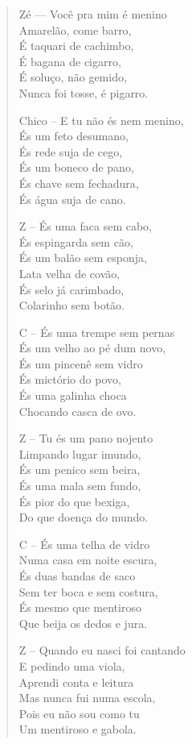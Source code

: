 \begin{verse}
Zé — Você pra mim é menino\\
Amarelão, come barro,\\
É taquari de cachimbo,\\
É bagana de cigarro,\\
É soluço, não gemido,\\
Nunca foi tosse, é pigarro.

Chico – E tu não és nem menino,\\
És um feto desumano,\\
És rede suja de cego,\\
És um boneco de pano,\\
És chave sem fechadura,\\
És água suja de cano.

Z – És uma faca sem cabo,\\
És espingarda sem cão,\\
És um balão sem esponja,\\
Lata velha de covão,\\
És selo já carimbado,\\
Colarinho sem botão.

C – És uma trempe sem pernas\\
És um velho ao pé dum novo,\\
És um pincenê sem vidro\\
És mictório do povo,\\
És uma galinha choca\\
Chocando casca de ovo.
\pagebreak

Z – Tu és um pano nojento\\
Limpando lugar imundo,\\
És um penico sem beira,\\
És uma mala sem fundo,\\
És pior do que bexiga,\\
Do que doença do mundo.

C – És uma telha de vidro\\
Numa casa em noite escura,\\
És duas bandas de saco\\
Sem ter boca e sem costura,\\
És mesmo que mentiroso\\
Que beija os dedos e jura. 

Z – Quando eu nasci foi cantando\\
E pedindo uma viola,\\
Aprendi conta e leitura\\
Mas nunca fui numa escola,\\
Pois eu não sou como tu\\
Um mentiroso e gabola.


\end{verse}
